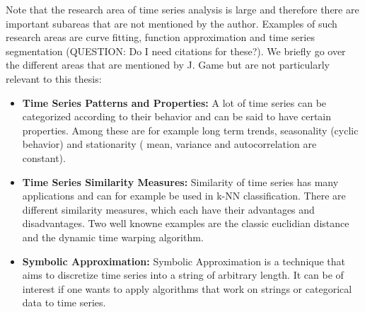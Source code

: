 Note that the research area of time series analysis is large and therefore there are important subareas that are not mentioned by the author. Examples of such research areas are curve fitting, function approximation and time series segmentation (QUESTION: Do I need citations for these?). We briefly go over the different areas that are mentioned by J. Game but are not particularly relevant to this thesis:

\begin{itemize}
	\item \textbf{Time Series Patterns and Properties:} A lot of time series can be categorized according to their behavior and can be said to have certain properties. Among these are for example long term trends, seasonality (cyclic behavior) and stationarity ( mean, variance and autocorrelation are constant).
	\item \textbf{Time Series Similarity Measures:} Similarity of time series has many applications and can for example be used in k-NN classification. There are different similarity measures, which each have their advantages and disadvantages. Two well knowne examples are the classic euclidian distance and the dynamic time warping algorithm.
	\item \textbf{Symbolic Approximation:} Symbolic Approximation is a technique that aims to discretize time series into a string of arbitrary length. It can be of interest if one wants to apply algorithms that work on strings or categorical data to time series.
\end{itemize}

